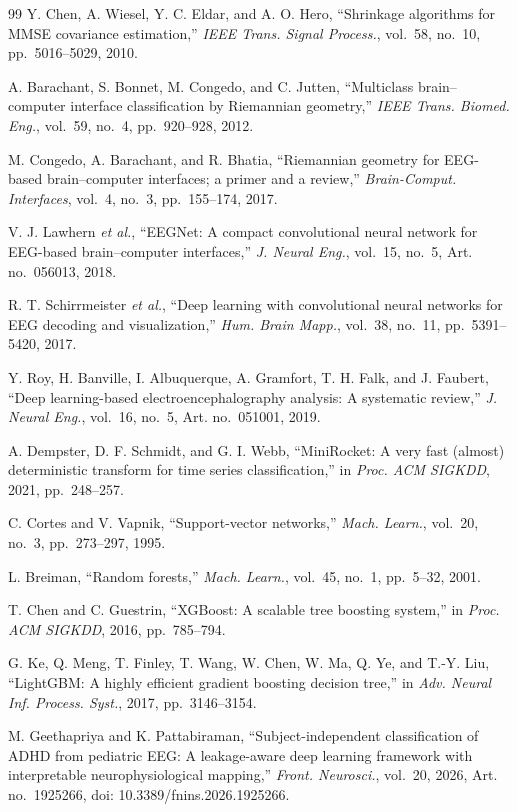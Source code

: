 \begin{thebibliography}{99}
 Y. Chen, A. Wiesel, Y. C. Eldar, and A. O. Hero, ``Shrinkage algorithms for
MMSE covariance estimation,'' \emph{IEEE Trans. Signal Process.}, vol.~58, no.~10,
pp.~5016--5029, 2010.

 A. Barachant, S. Bonnet, M. Congedo, and C. Jutten, ``Multiclass
brain--computer interface classification by Riemannian geometry,'' \emph{IEEE Trans. Biomed.
Eng.}, vol.~59, no.~4, pp.~920--928, 2012.

 M. Congedo, A. Barachant, and R. Bhatia, ``Riemannian geometry for
EEG-based brain--computer interfaces; a primer and a review,'' \emph{Brain-Comput.
Interfaces}, vol.~4, no.~3, pp.~155--174, 2017.

 V. J. Lawhern \emph{et al.}, ``EEGNet: A compact convolutional neural
network for EEG-based brain--computer interfaces,'' \emph{J. Neural Eng.}, vol.~15, no.~5,
Art. no.~056013, 2018.

 R. T. Schirrmeister \emph{et al.}, ``Deep learning with
convolutional neural networks for EEG decoding and visualization,'' \emph{Hum. Brain Mapp.},
vol.~38, no.~11, pp.~5391--5420, 2017.

 Y. Roy, H. Banville, I. Albuquerque, A. Gramfort, T. H. Falk, and J.
Faubert, ``Deep learning-based electroencephalography analysis: A systematic review,''
\emph{J. Neural Eng.}, vol.~16, no.~5, Art. no.~051001, 2019.

 A. Dempster, D. F. Schmidt, and G. I. Webb, ``MiniRocket: A very fast
(almost) deterministic transform for time series classification,'' in \emph{Proc. ACM SIGKDD},
2021, pp.~248--257.

 C. Cortes and V. Vapnik, ``Support-vector networks,'' \emph{Mach.
Learn.}, vol.~20, no.~3, pp.~273--297, 1995.

 L. Breiman, ``Random forests,'' \emph{Mach. Learn.}, vol.~45, no.~1,
pp.~5--32, 2001.

 T. Chen and C. Guestrin, ``XGBoost: A scalable tree boosting system,'' in
\emph{Proc. ACM SIGKDD}, 2016, pp.~785--794.

 G. Ke, Q. Meng, T. Finley, T. Wang, W. Chen, W. Ma, Q. Ye, and T.-Y. Liu,
``LightGBM: A highly efficient gradient boosting decision tree,'' in \emph{Adv. Neural Inf.
Process. Syst.}, 2017, pp.~3146--3154.

 M. Geethapriya and K. Pattabiraman, ``Subject-independent
classification of ADHD from pediatric EEG: A leakage-aware deep learning framework with
interpretable neurophysiological mapping,'' \emph{Front. Neurosci.}, vol.~20, 2026, Art.
no.~1925266, doi: 10.3389/fnins.2026.1925266.


\end{thebibliography}
